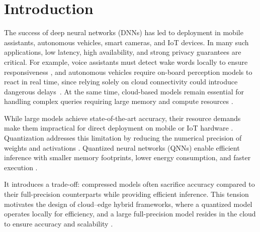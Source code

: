 \documentclass[11pt]{article}
\begin{document}
\section{Introduction}
The success of deep neural networks (DNNs) has led to deployment in mobile assistants, autonomous
vehicles, smart cameras, and IoT devices. In many such applications, low latency,
high availability, and strong privacy guarantees are critical. For example, 
voice assistants must detect wake words locally to ensure responsiveness
\cite{chen2014small,he2019streaming}, and autonomous vehicles require on-board perception models to react in real time, since relying solely on cloud connectivity could introduce
dangerous delays~\cite{richards2025edge,janai2020computer}.
At the same time, cloud-based models remain essential for handling complex queries
requiring large memory and compute resources \cite{computeinmemory2024,wolters2024memory}.

While large models achieve state-of-the-art accuracy, their resource demands
make them impractical for direct deployment on mobile or IoT hardware
\cite{han2015deep,howard2017mobilenets}. 
Quantization addresses this limitation by reducing the numerical
precision of weights and activations \cite{hubara2017quantized,gholami2021survey}.
Quantized neural networks (QNNs) enable efficient inference with smaller
memory footprints, lower energy consumption, and faster execution
\cite{krishnamoorthi2018quantizing}.

It introduces a trade-off:
compressed models often sacrifice accuracy compared to
their full-precision counterparts \cite{banner2019post} while providing efficient inference. This tension
motivates the design of cloud–edge hybrid frameworks, where a
quantized model operates locally for efficiency, and a large
full-precision model resides in the cloud to ensure accuracy and
scalability \cite{hao2024hybrid}.
\end{document}
